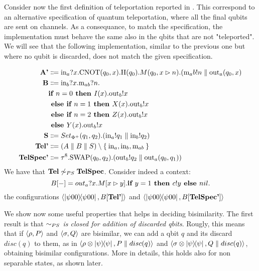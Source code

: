 Consider now the first definition of teleportation reported in \cite{fengBisimulationQuantumProcesses2012}. This correspond to an  alternative specification of quantum teleportation, where all the final qubits are sent on channels. As a consequance, to match the specification, the implementation must behave the same also in the qbits that are not "teleported". We will see that the following
implementation, similar to the previous one
but where no qubit is discarded, does not
match the given specification.
\begin{example}
\begin{align*}
  \text{\textbf{A'}} &\Coloneqq \text{in}_a?x.\text{CNOT}(q_0, x).\text{H}(q_0).M(q_0, x \rhd n).(\text{m}_ab!n \parallel \text{out}_a(q_0, x)\\
  \text{\textbf{B}} &\Coloneqq \text{in}_b?x.\text{m}_{ab}?n.
     \\ & \textbf{if } n = 0 \textbf{ then } I(x).\text{out}_b!x\\& \textbf{ else } \textbf{if } n = 1 \textbf{ then } X(x).\text{out}_b!x\\& \textbf{ else } \textbf{if } n = 2 \textbf{ then } Z(x).\text{out}_b!x\\& \textbf{ else } Y(x).\text{out}_b!x
   \\
  \text{\textbf{S}} &\Coloneqq Set_{\Phi^+}(q_1, q_2).(\text{in}_a!q_1 \parallel \text{in}_b!q_2) \\
  \text{\textbf{Tel'}} &\Coloneqq (A \parallel B \parallel S) \setminus \Set{\text{in}_a, \text{in}_b, \text{m}_{ab} } \\
  \text{\textbf{TelSpec'}} &\Coloneqq \tau^8.\text{SWAP}(q_0,q_2).(\text{out}_b!q_2 \parallel \text{out}_a(q_0, q_1))
\end{align*}
	We have that $\text{\textbf{Tel}} \not\sim_{PS} \text{\textbf{TelSpec}}$.
	Consider indeed a context:
  \[ B[{-}] = out_{a} ? x . M[x \rhd y] . \textbf{if } y = 1 \textbf{ then } c!y \textbf{ else } nil. \]
  the configurations $\langle\ket{\psi 00}\!\!\bra{\psi 00}, B[\text{\textbf{Tel'}}]\rangle$ and $\langle\ket{\psi 00}\!\!\bra{\psi 00}, B[\text{\textbf{TelSpec'}}]\rangle$
\end{example}


We show now some useful properties that helps in deciding bisimilarity. The first result is that \textit{$\sim_{PS}$ is closed for addition of discarded qbits}.  Rougly, this means that if  $\langle\rho, P\rangle$ and $\langle\sigma, Q\rangle$ are bisimilar,  we can add a qbit $q$ and its discard $disc(q)$ to them, as in  $\langle\rho \otimes \ket{\psi}\!\!\bra{\psi}, P \parallel disc(q)\rangle$ and $\langle\sigma \otimes \ket{\psi}\!\!\bra{\psi}, Q \parallel disc(q)\rangle$, obtaining bisimilar configurations. More in details, this holds also for non separable states, as shown later.


